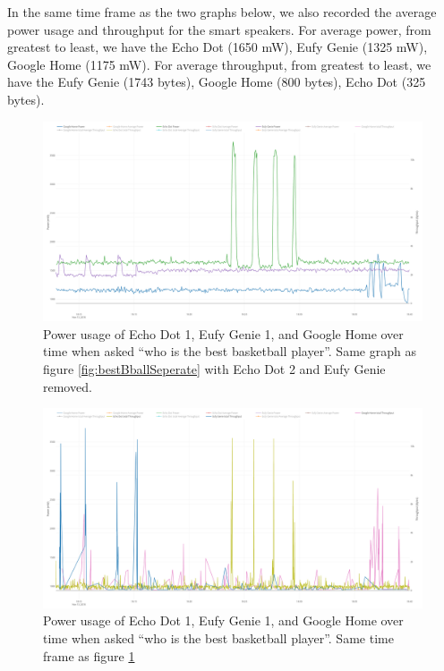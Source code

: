 In the same time frame as the two graphs below, we also recorded the average power usage and throughput for the smart speakers. For average power, from greatest to least, we have the Echo Dot (1650 mW), Eufy Genie (1325 mW), Google Home (1175 mW). For average throughput, from greatest to least, we have the Eufy Genie (1743 bytes), Google Home (800 bytes), Echo Dot (325 bytes).

\begin{figure}[H]
  \centering
  \includegraphics[width=1\textwidth]{figures/smartSpeakerSeperate.png}
  \caption{Power usage of Echo Dot 1, Eufy Genie 1, and Google Home over time when asked ``who is the best basketball player''. Same graph as figure \ref{fig:bestBballSeperate} with Echo Dot 2 and Eufy Genie removed.}
  \label{fig:smartSpeakerSeperate}
\end{figure}

\begin{figure}[H]
  \centering
  \includegraphics[width=1\textwidth]{figures/smartSpeakerNetworkSeperate.png}
  \caption{Power usage of Echo Dot 1, Eufy Genie 1, and Google Home over time when asked ``who is the best basketball player''. Same time frame as figure \ref{fig:smartSpeakerSeperate}}
  \label{fig:smartSpeakerNetworkSeperate}
\end{figure}

